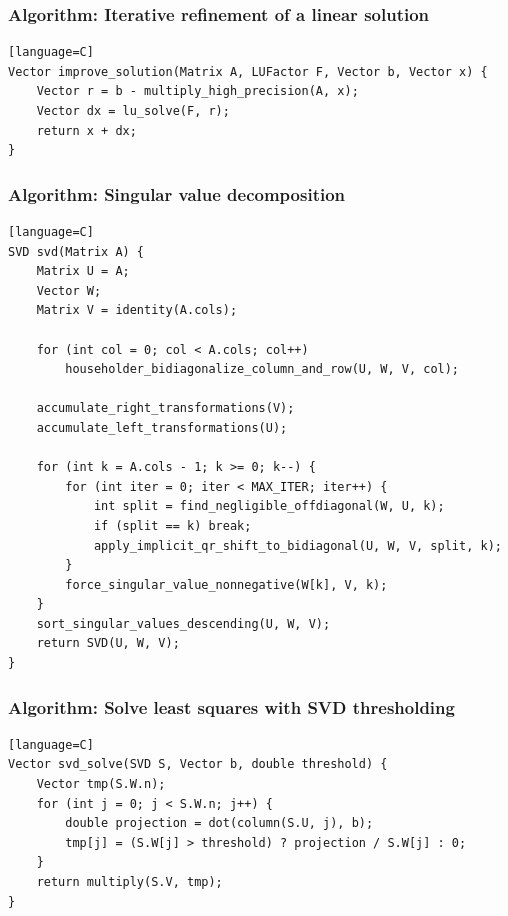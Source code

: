 \documentclass[11pt]{article}
\begin{document}
\subsubsection{Algorithm: Iterative refinement of a linear solution}\label{algorithm-iterative-refinement-of-a-linear-solution}

\begin{verbatim}[language=C]
Vector improve_solution(Matrix A, LUFactor F, Vector b, Vector x) {
    Vector r = b - multiply_high_precision(A, x);
    Vector dx = lu_solve(F, r);
    return x + dx;
}
\end{verbatim}

\subsubsection{Algorithm: Singular value decomposition}\label{algorithm-singular-value-decomposition}

\begin{verbatim}[language=C]
SVD svd(Matrix A) {
    Matrix U = A;
    Vector W;
    Matrix V = identity(A.cols);

    for (int col = 0; col < A.cols; col++)
        householder_bidiagonalize_column_and_row(U, W, V, col);

    accumulate_right_transformations(V);
    accumulate_left_transformations(U);

    for (int k = A.cols - 1; k >= 0; k--) {
        for (int iter = 0; iter < MAX_ITER; iter++) {
            int split = find_negligible_offdiagonal(W, U, k);
            if (split == k) break;
            apply_implicit_qr_shift_to_bidiagonal(U, W, V, split, k);
        }
        force_singular_value_nonnegative(W[k], V, k);
    }
    sort_singular_values_descending(U, W, V);
    return SVD(U, W, V);
}
\end{verbatim}

\subsubsection{Algorithm: Solve least squares with SVD thresholding}\label{algorithm-solve-least-squares-with-svd-thresholding}

\begin{verbatim}[language=C]
Vector svd_solve(SVD S, Vector b, double threshold) {
    Vector tmp(S.W.n);
    for (int j = 0; j < S.W.n; j++) {
        double projection = dot(column(S.U, j), b);
        tmp[j] = (S.W[j] > threshold) ? projection / S.W[j] : 0;
    }
    return multiply(S.V, tmp);
}
\end{verbatim}
\end{document}
